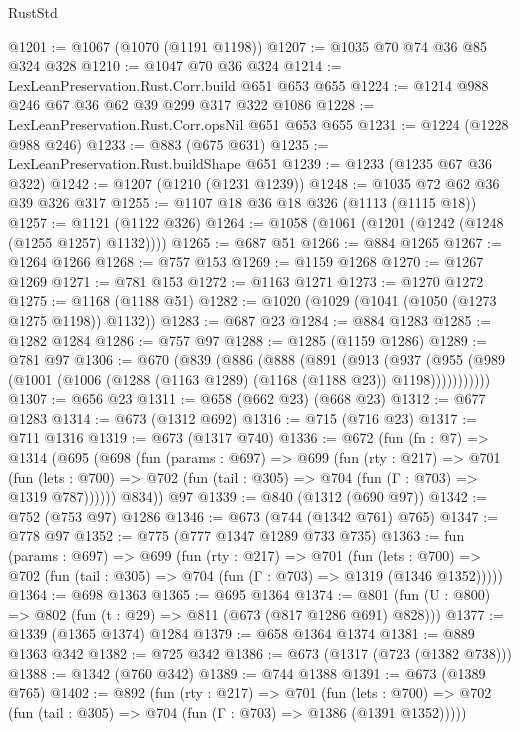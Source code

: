\begin{lexlean}{RustStd}
\begin{coremodule}
@1201 := @1067 (@1070 (@1191 @1198))
@1207 := @1035 @70 @74 @36 @85 @324 @328
@1210 := @1047 @70 @36 @324
@1214 := LexLeanPreservation.Rust.Corr.build @651 @653 @655
@1224 := @1214 @988 @246 @67 @36 @62 @39 @299 @317 @322 @1086
@1228 := LexLeanPreservation.Rust.Corr.opsNil @651 @653 @655
@1231 := @1224 (@1228 @988 @246)
@1233 := @883 (@675 @631)
@1235 := LexLeanPreservation.Rust.buildShape @651
@1239 := @1233 (@1235 @67 @36 @322)
@1242 := @1207 (@1210 (@1231 @1239))
@1248 := @1035 @72 @62 @36 @39 @326 @317
@1255 := @1107 @18 @36 @18 @326 (@1113 (@1115 @18))
@1257 := @1121 (@1122 @326)
@1264 := @1058 (@1061 (@1201 (@1242 (@1248 (@1255 @1257) @1132))))
@1265 := @687 @51
@1266 := @884 @1265
@1267 := @1264 @1266
@1268 := @757 @153
@1269 := @1159 @1268
@1270 := @1267 @1269
@1271 := @781 @153
@1272 := @1163 @1271
@1273 := @1270 @1272
@1275 := @1168 (@1188 @51)
@1282 := @1020 (@1029 (@1041 (@1050 (@1273 @1275 @1198)) @1132))
@1283 := @687 @23
@1284 := @884 @1283
@1285 := @1282 @1284
@1286 := @757 @97
@1288 := @1285 (@1159 @1286)
@1289 := @781 @97
@1306 := @670
    (@839
      (@886
        (@888
          (@891
            (@913
              (@937
                (@955 (@989 (@1001 (@1006 (@1288 (@1163 @1289) (@1168 (@1188 @23)) @1198)))))))))))
@1307 := @656 @23
@1311 := @658 (@662 @23) (@668 @23)
@1312 := @677 @1283
@1314 := @673 (@1312 @692)
@1316 := @715 (@716 @23)
@1317 := @711 @1316
@1319 := @673 (@1317 @740)
@1336 := @672
    (fun (fn : @7) =>
    @1314
      (@695
        (@698
          (fun (params : @697) =>
          @699
            (fun (rty : @217) =>
            @701
              (fun (lets : @700) =>
              @702 (fun (tail : @305) => @704 (fun (Γ : @703) => @1319 @787))))))
        @834))
    @97
@1339 := @840 (@1312 (@690 @97))
@1342 := @752 (@753 @97) @1286
@1346 := @673 (@744 (@1342 @761) @765)
@1347 := @778 @97
@1352 := @775 (@777 @1347 @1289 @733 @735)
@1363 := fun (params : @697) =>
  @699
    (fun (rty : @217) =>
    @701
      (fun (lets : @700) =>
      @702 (fun (tail : @305) => @704 (fun (Γ : @703) => @1319 (@1346 @1352)))))
@1364 := @698 @1363
@1365 := @695 @1364
@1374 := @801 (fun (U : @800) => @802 (fun (t : @29) => @811 (@673 (@817 @1286 @691) @828)))
@1377 := @1339 (@1365 @1374) @1284
@1379 := @658 @1364 @1374
@1381 := @889 @1363 @342
@1382 := @725 @342
@1386 := @673 (@1317 (@723 (@1382 @738)))
@1388 := @1342 (@760 @342)
@1389 := @744 @1388
@1391 := @673 (@1389 @765)
@1402 := @892
    (fun (rty : @217) =>
    @701
      (fun (lets : @700) =>
      @702 (fun (tail : @305) => @704 (fun (Γ : @703) => @1386 (@1391 @1352)))))

\end{coremodule}
\end{lexlean}
